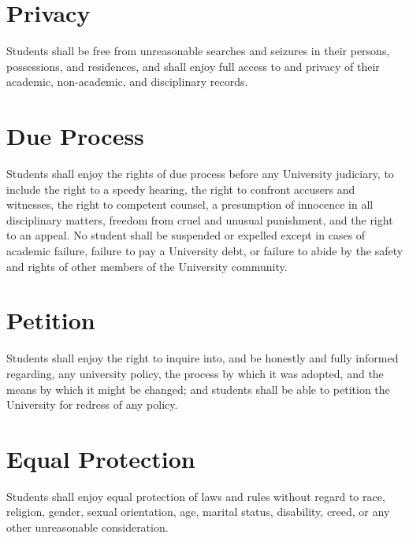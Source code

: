 \section{Privacy}
    Students shall be free from unreasonable searches and seizures in their persons, possessions, and residences, and shall enjoy full access to and privacy of their academic, non-academic, and disciplinary records.

\section{Due Process}
    Students shall enjoy the rights of due process before any University judiciary, to include the right to a speedy hearing, the right to confront accusers and witnesses, the right to competent counsel, a presumption of innocence in all disciplinary matters, freedom from cruel and unusual punishment, and the right to an appeal. No student shall be suspended or expelled except in cases of academic failure, failure to pay a University debt, or failure to abide by the safety and rights of other members of the University community.

\section{Petition}
    Students shall enjoy the right to inquire into, and be honestly and fully informed regarding, any university policy, the process by which it was adopted, and the means by which it might be changed; and students shall be able to petition the University for redress of any policy.

\section{Equal Protection}
    Students shall enjoy equal protection of laws and rules without regard to race, religion, gender, sexual orientation, age, marital status, disability, creed, or any other unreasonable consideration.